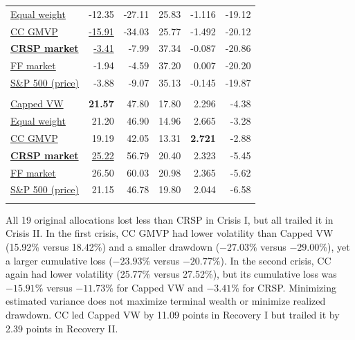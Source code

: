 \documentclass[letterpaper,journal]{IEEEtran}
\begin{document}
\begin{table}[!tp]
\begin{minipage}[t]{0.485\textwidth}
\begin{tabular}[t]{@{}lrrrrr@{}}
\hyperref[alloc:equal_weight]{Equal weight} & -12.35 & -27.11 & 25.83 & -1.116 & -19.12 \\
\hyperref[alloc:gmvp_constant_corr]{CC GMVP} & \underline{-15.91} & -34.03 & 25.77 & -1.492 & -20.12 \\
\textbf{\hyperref[alloc:CRSP_market]{CRSP market}} & \underline{-3.41} & -7.99 & 37.34 & -0.087 & -20.86 \\
\hyperref[alloc:FF_market]{FF market} & -1.94 & -4.59 & 37.20 & 0.007 & -20.20 \\
\hyperref[alloc:SP500]{S\&P 500 (price)} & -3.88 & -9.07 & 35.13 & -0.145 & -19.87 \\
\addlinespace[4pt]
\multicolumn{6}{@{}l}{\textit{Recovery II}}\\[1pt]
\hyperref[alloc:source_weight]{Capped VW} & \textbf{21.57} & 47.80 & 17.80 & 2.296 & -4.38 \\
\hyperref[alloc:equal_weight]{Equal weight} & 21.20 & 46.90 & 14.96 & 2.665 & -3.28 \\
\hyperref[alloc:gmvp_constant_corr]{CC GMVP} & 19.19 & 42.05 & 13.31 & \textbf{2.721} & -2.88 \\
\textbf{\hyperref[alloc:CRSP_market]{CRSP market}} & \underline{25.22} & 56.79 & 20.40 & 2.323 & -5.45 \\
\hyperref[alloc:FF_market]{FF market} & 26.50 & 60.03 & 20.98 & 2.365 & -5.62 \\
\hyperref[alloc:SP500]{S\&P 500 (price)} & 21.15 & 46.78 & 19.80 & 2.044 & -6.58 \\
\addlinespace[4pt]
\bottomrule\end{tabular}\end{minipage}
\end{table}


All 19 original allocations lost less than CRSP in Crisis I, but all trailed it in Crisis II. In the first crisis, CC GMVP had lower volatility than Capped VW (15.92\% versus 18.42\%) and a smaller drawdown ($-27.03\%$ versus $-29.00\%$), yet a larger cumulative loss ($-23.93\%$ versus $-20.77\%$). In the second crisis, CC again had lower volatility (25.77\% versus 27.52\%), but its cumulative loss was $-15.91\%$ versus $-11.73\%$ for Capped VW and $-3.41\%$ for CRSP. Minimizing estimated variance does not maximize terminal wealth or minimize realized drawdown. CC led Capped VW by 11.09 points in Recovery I but trailed it by 2.39 points in Recovery II.
\end{document}
